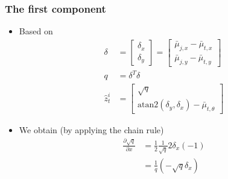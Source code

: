 \begin{frame}
    \frametitle{The first component}

    \begin{itemize}
        \item Based on
        \begin{align*}
            \delta &= 
            \begin{bmatrix}
                \delta_x \\
                \delta_y
            \end{bmatrix}
            = \begin{bmatrix}
                \bar{\mu}_{j,x} - \bar{\mu}_{t,x} \\
                \bar{\mu}_{j,y} - \bar{\mu}_{t,y}
            \end{bmatrix}\\
            q &= \delta^T \delta\\
            \hat{z}^i_t &= 
            \begin{bmatrix}
                \sqrt{q} \\
                \text{atan2}(\delta_y, \delta_x) - \bar{\mu}_{t,\theta}
            \end{bmatrix}
        \end{align*}    
    
        \item We obtain (by applying the chain rule)
        \begin{align*}
            \frac{\partial \sqrt{q}}{\partial x}
            &= \frac{1}{2} \frac{1}{\sqrt{q}} 2 \delta_x (-1)\\
            &= \frac{1}{q} \left(-\sqrt{q} \delta_x \right)
        \end{align*} 
    \end{itemize}

\end{frame}

